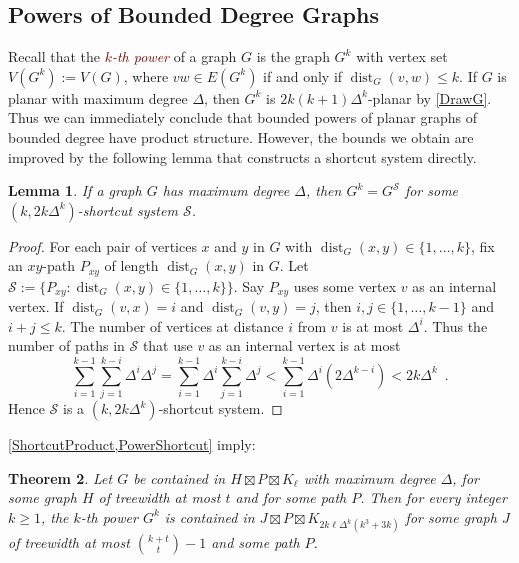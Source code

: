\documentclass{patmorin}
\theoremstyle{plain}
\newtheorem{thm}{Theorem}
\newtheorem{lem}[thm]{Lemma}
\theoremstyle{definition}
\newcommand{\defin}[1]{\textcolor{Maroon}{\emph{#1}}}
\newcommand{\note}[2]{\noindent{\color{red}[#1:~#2]}}
\DeclareMathOperator{\dist}{dist}
\renewcommand{\SS}{\mathcal{S}}
\renewcommand{\le}{\leqslant}
\renewcommand{\geq}{\geqslant}
\renewcommand{\leq}{\leqslant}
\begin{document}


\subsection{Powers of Bounded Degree Graphs}
\label{Powers}
\label{mid_example}

Recall that the \defin{$k$-th power} of a graph $G$ is the graph $G^k$ with vertex set $V(G^k):=V(G)$, where $vw\in E(G^k)$ if and only if $\dist_G(v,w)\leq k$. If $G$ is planar with maximum degree $\Delta$, then $G^k$ is $2k(k+1)\Delta^{k}$-planar by \cref{DrawG}.  Thus we can immediately conclude that bounded powers of planar graphs of bounded degree have product structure. However, the bounds we obtain are improved by the following lemma that constructs a shortcut system directly.

\begin{lem}
\label{PowerShortcut}
If a graph $G$ has maximum degree $\Delta$, then $G^k = G^\SS$ for some $(k,2k \Delta^{k})$-shortcut system $\SS$.
\end{lem}

\begin{proof}
For each pair of vertices $x$ and $y$ in $G$ with $\dist_G(x,y)\in\{1,\dots,k\}$, fix an $xy$-path $P_{xy}$ of length
$\dist_G(x,y)$  in $G$. Let $\SS:=\{P_{xy}: \dist_G(x,y)\in\{1,\dots,k\} \}$. Say $P_{xy}$ uses some vertex $v$ as an internal vertex. If $\dist_G(v,x)=i$ and $\dist_G(v,y)=j$, then $i,j\in\{1,\dots,k-1\}$ and $i+j\leq k$. The number of vertices at distance $i$ from $v$ is at most $\Delta^i$. Thus the number of paths in $\SS$ that use $v$ as an internal vertex is at most
\[\sum_{i=1}^{k-1} \sum_{j=1}^{k-i} \Delta^i\Delta^j
= \sum_{i=1}^{k-1} \Delta^i \sum_{j=1}^{k-i} \Delta^j
< \sum_{i=1}^{k-1} \Delta^i ( 2 \Delta^{k-i} )
< 2k \Delta^k\enspace.\]
Hence $\SS$ is a $(k, 2k \Delta^k)$-shortcut system.
\end{proof}

\cref{ShortcutProduct,PowerShortcut} imply:

\begin{thm}
\label{PowerProduct}
Let $G$ be contained in $H\boxtimes P\boxtimes K_\ell$ with maximum degree $\Delta$, for some graph $H$ of treewidth at most $t$ and for some path $P$. Then for every integer $k\geq 1$, the $k$-th power $G^k$ is contained in $J\boxtimes P\boxtimes K_{2k \ell \Delta^{k}(k^3+3k)}$ for some graph $J$ of treewidth at most $\binom{k+t}{t}-1$ and some path $P$.
\end{thm}
\end{document}

